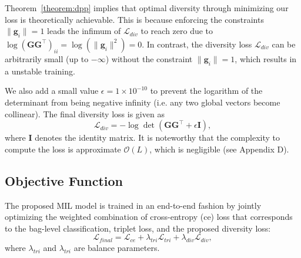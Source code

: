 \documentclass[runningheads]{llncs}
\begin{document}
\begin{remark}
\label{remark:div_loss}
Theorem~\ref{theorem:dpp} implies that optimal diversity through minimizing our loss is theoretically achievable. This is because enforcing the constraints $\|\boldsymbol{g}_i\|=1$ leads the infimum of $\mathcal{L}_{div}$ to reach zero due to $\log(\boldsymbol{G}\boldsymbol{G}^{\top})_{ii}=\log(\|\boldsymbol{g}_i\|^2)=0$. In contrast, the diversity loss $\mathcal{L}_{div}$ can be arbitrarily small (up to $-\infty$) without the constraint $\|\boldsymbol{g}_i\|=1$, which results in a unstable training.
\end{remark}

We also add a small value $\epsilon=1\times 10^{-10}$ to prevent the logarithm of the determinant from being negative infinity (i.e. any two global vectors become collinear). The final diversity loss is given as 
\begin{equation}
    \mathcal{L}_{div}= -\log\operatorname{det}(\boldsymbol{G}\boldsymbol{G}^{\top}+\epsilon\boldsymbol{I}),
\end{equation}
where $\boldsymbol{I}$ denotes the identity matrix. It is noteworthy that the complexity to compute the loss is approximate $ \mathcal{O}(L)$, which is negligible (see Appendix D).


\subsection{Objective Function}
The proposed MIL model is trained in an end-to-end fashion by jointly optimizing the weighted combination of cross-entropy (ce) loss that corresponds to the bag-level classification, triplet loss, and the proposed diversity loss:
\begin{equation}
    \mathcal{L}_{final} = \mathcal{L}_{ce} + \lambda_{tri} \mathcal{L}_{tri} + \lambda_{div}\mathcal{L}_{div}, 
\end{equation}
where $\lambda_{tri}$ and $\lambda_{tri}$ are balance parameters.
\end{document}
